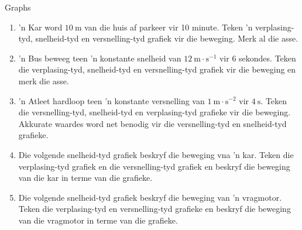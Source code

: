     \noindent
   \label{m38795*secfhsst!!!underscore!!!id3332}
\begin{exercises}{Graphs}
            \nopagebreak \noindent

\begin{enumerate}[noitemsep, label=\textbf{\arabic*}. ] 
    \item 'n Kar word $10~\text{m}$ van die huis af parkeer vir 10 minute. Teken 'n verplasing-tyd, snelheid-tyd en versnelling-tyd grafiek vir die beweging. Merk al die asse.

    \item 'n Bus beweeg teen 'n konstante snelheid van $12~\text{m}\ensuremath{\cdot}\text{s}{}^{-1}$ vir 6 sekondes. Teken die verplasing-tyd, snelheid-tyd en versnelling-tyd grafiek vir die beweging en merk die asse.

    \item 'n Atleet hardloop teen 'n konstante versnelling van $1~\text{m}\ensuremath{\cdot}\text{s}{}^{-2}$ vir $4~\text{s}$. Teken die versnelling-tyd, snelheid-tyd en verplasing-tyd grafieke vir die beweging. Akkurate waardes word net benodig vir die versnelling-tyd en snelheid-tyd grafieke. 

    \item Die volgende snelheid-tyd grafiek beskryf die beweging vna 'n kar. Teken die verplasing-tyd grafiek en die versnelling-tyd grafiek en beskryf die beweging van die kar in terme van die grafieke. 
\begin{figure}[H] %
\begin{center}
\end{center}

\end{figure}   

\item Die volgende snelheid-tyd grafiek beskryf die beweging van 'n vragmotor. Teken die verplasing-tyd en versnelling-tyd grafieke en beskryf die beweging van die vragmotor in terme van die grafieke.
\begin{figure}[H] %
\begin{center}
\end{center}
 \end{figure}               \end{enumerate}



\end{exercises}
